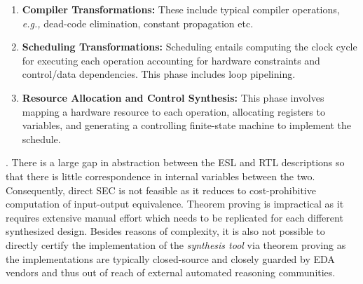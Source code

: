  \begin{enumerate}
\item {\bf Compiler Transformations:} These include typical
  compiler operations, {\em e.g.,} dead-code elimination,
  constant propagation etc. 
\item {\bf Scheduling Transformations:} Scheduling entails
  computing the clock cycle for executing each operation 
  accounting for hardware constraints
  and control/data dependencies.  This phase includes loop pipelining.
\item {\bf Resource Allocation and Control Synthesis:} This phase
  involves mapping a hardware resource to each operation, allocating
  registers to variables, and generating a controlling finite-state
  machine to implement the schedule.
\end{enumerate}. 
There is a large gap in abstraction
between the ESL and RTL descriptions so that there is little
correspondence in internal variables between the two.  Consequently,
direct SEC is not feasible as it reduces to cost-prohibitive computation of
input-output equivalence. Theorem proving is impractical as it requires extensive manual effort 
which needs to be replicated for each different synthesized
design. Besides reasons of complexity, it is also not possible to
directly certify the implementation of the {\em synthesis tool} via
theorem proving as the implementations are typically closed-source and
closely guarded by EDA vendors and thus out of reach of external
automated reasoning communities.


